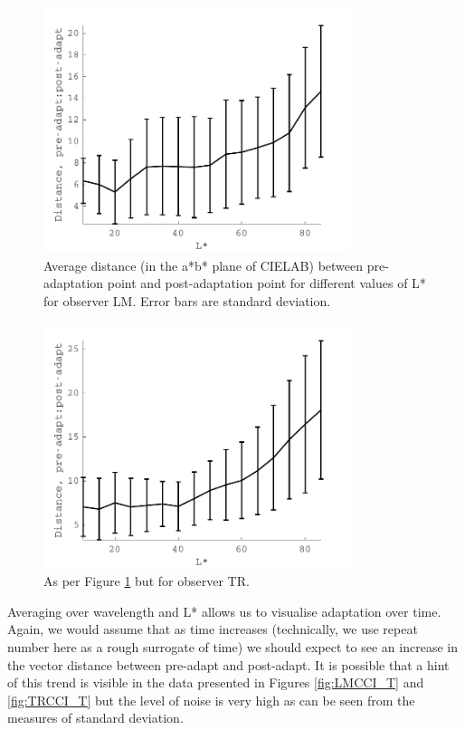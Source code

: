 \begin{figure}[htbp]
\includegraphics[max width=0.8\textwidth]{figs/LargeSphere/LMCCI_L.pdf}
\caption{Average distance (in the a*b* plane of CIELAB) between pre-adaptation point and post-adaptation point for different values of L* for observer LM. Error bars are standard deviation.}
\label{fig:LMCCI_L}
\end{figure}

\begin{figure}[htbp]
\includegraphics[max width=0.8\textwidth]{figs/LargeSphere/TRCCI_L.pdf}
\caption{As per Figure \ref{fig:LMCCI_L} but for observer TR.}
\label{fig:TRCCI_L}
\end{figure}

Averaging over wavelength and L* allows us to visualise adaptation over time. Again, we would assume that as time increases (technically, we use repeat number here as a rough surrogate of time) we should expect to see an increase in the vector distance between pre-adapt and post-adapt. It is possible that a hint of this trend is visible in the data presented in Figures \ref{fig:LMCCI_T} and \ref{fig:TRCCI_T} but the level of noise is very high as can be seen from the measures of standard deviation.

